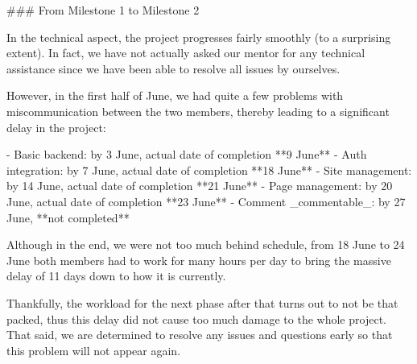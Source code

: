 \documentclass[11pt]{article}
\begin{document}
\begin{markdown}
### From Milestone 1 to Milestone 2

In the technical aspect, the project progresses fairly smoothly (to a surprising extent). In fact, we have not actually asked our mentor for any technical assistance since we have been able to resolve all issues by ourselves.

However, in the first half of June, we had quite a few problems with miscommunication between the two members, thereby leading to a significant delay in the project:

- Basic backend: by 3 June, actual date of completion **9 June**
- Auth integration: by 7 June, actual date of completion **18 June**
- Site management: by 14 June, actual date of completion **21 June**
- Page management: by 20 June, actual date of completion **23 June**
- Comment _commentable_: by 27 June, **not completed**

Although in the end, we were not too much behind schedule, from 18 June to 24 June both members had to work for many hours per day to bring the massive delay of 11 days down to how it is currently.

Thankfully, the workload for the next phase after that turns out to not be that packed, thus this delay did not cause too much damage to the whole project. That said, we are determined to resolve any issues and questions early so that this problem will not appear again.
\end{markdown}
\end{document}
